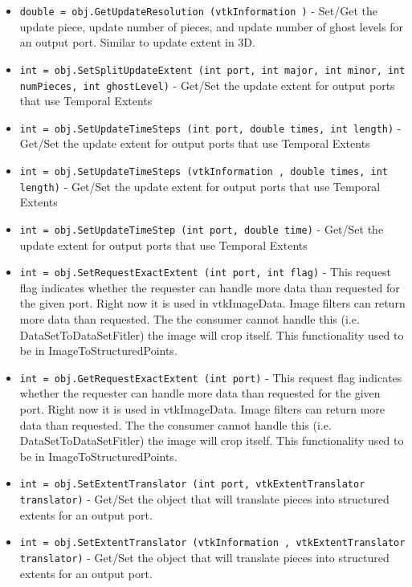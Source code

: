 \begin{itemize}
\item  \verb|double = obj.GetUpdateResolution (vtkInformation )| -  Set/Get the update piece, update number of pieces, and update
 number of ghost levels for an output port.  Similar to update
 extent in 3D.

\item  \verb|int = obj.SetSplitUpdateExtent (int port, int major, int minor, int numPieces, int ghostLevel)| -  Get/Set the update extent for output ports that use Temporal Extents

\item  \verb|int = obj.SetUpdateTimeSteps (int port, double times, int length)| -  Get/Set the update extent for output ports that use Temporal Extents

\item  \verb|int = obj.SetUpdateTimeSteps (vtkInformation , double times, int length)| -  Get/Set the update extent for output ports that use Temporal Extents

\item  \verb|int = obj.SetUpdateTimeStep (int port, double time)| -  Get/Set the update extent for output ports that use Temporal Extents

\item  \verb|int = obj.SetRequestExactExtent (int port, int flag)| -  This request flag indicates whether the requester can handle more
 data than requested for the given port.  Right now it is used in
 vtkImageData.  Image filters can return more data than requested.
 The the consumer cannot handle this (i.e. DataSetToDataSetFitler)
 the image will crop itself.  This functionality used to be in
 ImageToStructuredPoints.

\item  \verb|int = obj.GetRequestExactExtent (int port)| -  This request flag indicates whether the requester can handle more
 data than requested for the given port.  Right now it is used in
 vtkImageData.  Image filters can return more data than requested.
 The the consumer cannot handle this (i.e. DataSetToDataSetFitler)
 the image will crop itself.  This functionality used to be in
 ImageToStructuredPoints.

\item  \verb|int = obj.SetExtentTranslator (int port, vtkExtentTranslator translator)| -  Get/Set the object that will translate pieces into structured
 extents for an output port.

\item  \verb|int = obj.SetExtentTranslator (vtkInformation , vtkExtentTranslator translator)| -  Get/Set the object that will translate pieces into structured
 extents for an output port.


\end{itemize}
